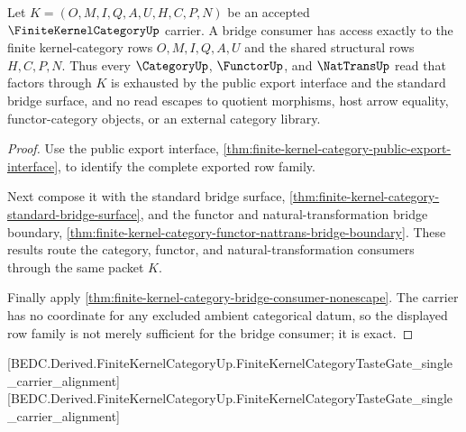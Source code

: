 \begin{theorem}
\label{thm:finite-kernel-category-bridge-nonescape-exactness}
Let $K=(O,M,I,Q,A,U,H,C,P,N)$ be an accepted
$\FiniteKernelCategoryUp$ carrier. A bridge consumer has access exactly to the
finite kernel-category rows $O,M,I,Q,A,U$ and the shared structural rows
$H,C,P,N$. Thus every $\CategoryUp$, $\FunctorUp$, and $\NatTransUp$ read that
factors through $K$ is exhausted by the public export interface and the
standard bridge surface, and no read escapes to quotient morphisms, host arrow
equality, functor-category objects, or an external category library.
\end{theorem}
\begin{proof}
Use the public export interface,
\autoref{thm:finite-kernel-category-public-export-interface}, to identify the
complete exported row family.

Next compose it with the standard bridge surface,
\autoref{thm:finite-kernel-category-standard-bridge-surface}, and the functor
and natural-transformation bridge boundary,
\autoref{thm:finite-kernel-category-functor-nattrans-bridge-boundary}. These
results route the category, functor, and natural-transformation consumers
through the same packet $K$.

Finally apply \autoref{thm:finite-kernel-category-bridge-consumer-nonescape}.
The carrier has no coordinate for any excluded ambient categorical datum, so
the displayed row family is not merely sufficient for the bridge consumer; it
is exact.
\end{proof}

[BEDC.Derived.FiniteKernelCategoryUp.FiniteKernelCategoryTasteGate\_single\_carrier\_alignment]
[BEDC.Derived.FiniteKernelCategoryUp.FiniteKernelCategoryTasteGate\_single\_carrier\_alignment]


